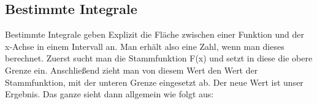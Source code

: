 \subsection{Bestimmte Integrale}
	Bestimmte Integrale geben Explizit die Fläche zwischen einer Funktion und der
	x-Achse in einem Intervall an. Man erhält also eine Zahl, wenn man dieses
	berechnet. Zuerst sucht man die Stammfunktion F(x) und setzt in diese die obere
	Grenze ein. Anschließend zieht man von diesem Wert den Wert der Stammfunktion,
	mit der unteren Grenze eingesetzt ab. Der neue Wert ist unser Ergebnis. Das
	ganze sieht dann allgemein wie folgt aus:
	\formel{\[\int\limits_a^b f(x) \ dx=F(b)-F(a)\]}

